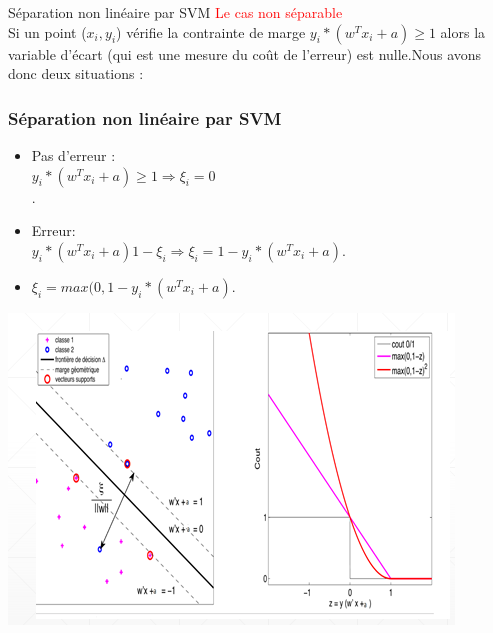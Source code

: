 \documentclass{bredelebeamer}
\begin{document}
\begin{frame}{Séparation non linéaire par SVM}
\textcolor{red}{Le cas non séparable}\vspace{1\baselineskip}\\ 
Si un point ($ x_i,y_i$) vérifie la contrainte de marge $y_i*(w^{T}x_i+a)\geq 1$ alors la variable d’écart (qui est une mesure du coût de l’erreur) est nulle.Nous avons donc deux situations :\\
\frametitle{Séparation non linéaire par SVM }
    \begin{minipage}{0.45\textwidth}
    \begin{itemize}
      \item Pas d’erreur :\\
      $y_i*(w^{T}x_i+a)\geq 1    \Rightarrow   \xi_i =0$\\.
      \item Erreur: \\
      $y_i*(w^{T}x_i+a)1-\xi_i    \Rightarrow   \xi_i=1-y_i*(w^{T}x_i+a) $.\\
      \item $\xi_i=max(0,1-y_i*(w^{T}x_i+a)$.\\ 
\end {itemize}
\end{minipage}
    \begin{minipage}{0.45\textwidth}
        \includegraphics[scale=0.55]{15.png}
    \end{minipage}
\end{frame}
\end{document}
